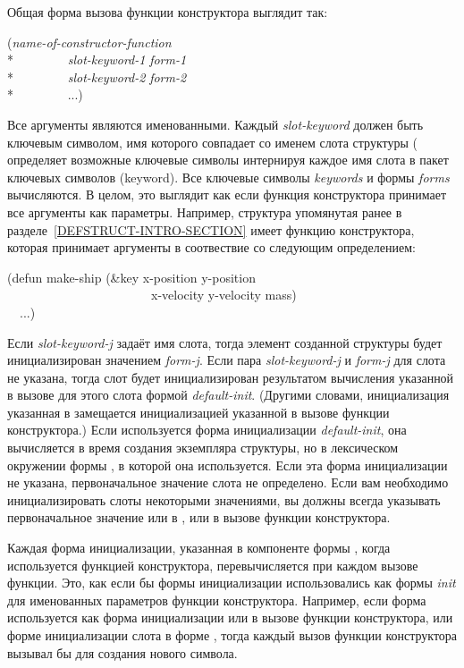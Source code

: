 Общая форма вызова функции конструктора выглядит так:
\begin{lisp}
(\emph{name-of-constructor-function} \\*
~~~~~~~~\emph{slot-keyword-1} \emph{form-1} \\*
~~~~~~~~\emph{slot-keyword-2} \emph{form-2} \\*
~~~~~~~~...)
\end{lisp}
Все аргументы являются именованными. Каждый \emph{slot-keyword} должен быть
ключевым символом, имя которого совпадает со именем слота структуры
( определяет возможные ключевые символы интернируя каждое имя
слота в пакет ключевых символов (keyword). Все ключевые символы \emph{keywords}
и формы \emph{forms} вычисляются. В целом, это выглядит как если функция
конструктора принимает все аргументы как  параметры. Например,
структура  упомянутая ранее в разделе~\ref{DEFSTRUCT-INTRO-SECTION}
имеет функцию конструктора, которая принимает аргументы в соотвествие со
следующим определением:
\begin{lisp}
(defun make-ship (\&key x-position y-position \\
~~~~~~~~~~~~~~~~~~~~~~~x-velocity y-velocity mass) \\
~~...)
\end{lisp}

\label{defstruct-initialization}
Если \emph{slot-keyword-j} задаёт имя слота, тогда элемент созданной структуры
будет инициализирован значением \emph{form-j}.
Если пара \emph{slot-keyword-j} и \emph{form-j} для слота не указана, тогда слот
будет инициализирован результатом вычисления указанной в вызове 
для этого слота формой \emph{default-init}.
(Другими словами, инициализация указанная в  замещается
инициализацией указанной в вызове функции конструктора.)
Если используется форма инициализации \emph{default-init}, она вычисляется в
время создания экземпляра структуры, но в лексическом окружении формы
, в которой она используется.
Если эта форма инициализации не указана, первоначальное значение слота не
определено.
Если вам необходимо инициализировать слоты некоторыми значениями, вы должны
всегда указывать первоначальное значение или в , или в 
вызове функции конструктора. 

Каждая форма инициализации, указанная в компоненте формы , когда
используется функцией конструктора, перевычисляется при каждом вызове
функции. Это, как если бы формы инициализации использовались как формы
\emph{init} для именованных параметров функции конструктора.
Например, если форма  используется как форма инициализации или в
вызове функции конструктора, или форме инициализации слота в форме
, тогда каждый вызов функции конструктора вызывал бы 
для создания нового символа.

